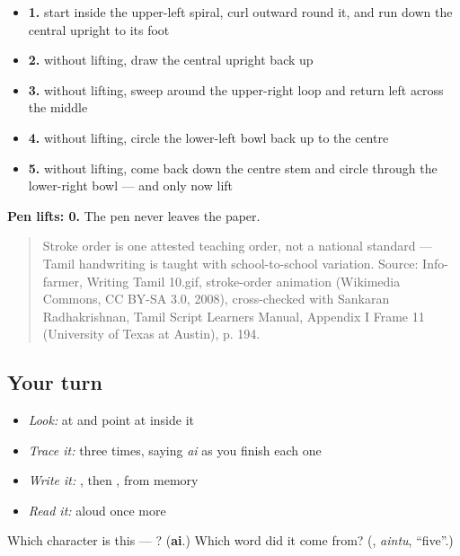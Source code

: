 \begin{itemize}
\raggedright
  \item \textbf{1.} start inside the upper-left spiral, curl outward round it, and run down the central upright to its foot
  \item \textbf{2.} without lifting, draw the central upright back up
  \item \textbf{3.} without lifting, sweep around the upper-right loop and return left across the middle
  \item \textbf{4.} without lifting, circle the lower-left bowl back up to the centre
  \item \textbf{5.} without lifting, come back down the centre stem and circle through the lower-right bowl — and only now lift
\end{itemize}

\textbf{Pen lifts: 0.} The pen never leaves the paper.

\begin{quote}
Stroke order is one attested teaching order, not a national standard — Tamil handwriting is taught with school-to-school variation. Source: Info-farmer, Writing Tamil 10.gif,  stroke-order animation (Wikimedia Commons, CC BY-SA 3.0, 2008), cross-checked with Sankaran Radhakrishnan, Tamil Script Learners Manual, Appendix I Frame 11 (University of Texas at Austin), p. 194.
\end{quote}

\subsection*{Your turn}
\begin{itemize}
\raggedright
  \item \emph{Look:} at \textbf{} and point at  inside it
  \item \emph{Trace it:}  three times, saying \emph{ai} as you finish each one
  \item \emph{Write it:} , then , from memory
  \item \emph{Read it:} \textbf{} aloud once more
\end{itemize}

\begin{tcolorbox}[breakable,colback=teal!4,colframe=teal!35!black,title={Before you move on}]
Which character is this — ? (\textbf{ai}.) Which word did it come from? (\textbf{}, \emph{aintu}, \textquotedblleft{}five\textquotedblright{}.)
\end{tcolorbox}
